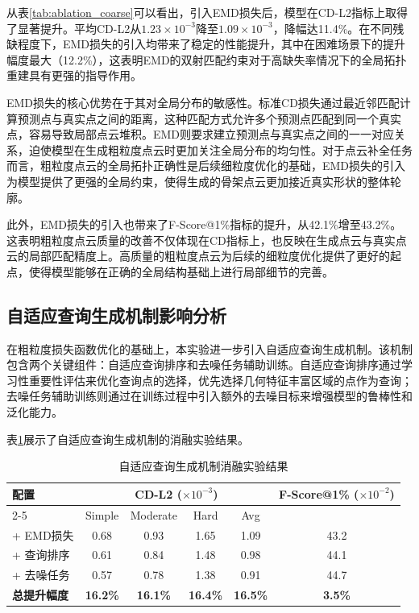 从表\ref{tab:ablation_coarse}可以看出，引入EMD损失后，模型在CD-L2指标上取得了显著提升。平均CD-L2从$1.23 \times 10^{-3}$降至$1.09 \times 10^{-3}$，降幅达11.4\%。在不同残缺程度下，EMD损失的引入均带来了稳定的性能提升，其中在困难场景下的提升幅度最大（12.2\%），这表明EMD的双射匹配约束对于高缺失率情况下的全局拓扑重建具有更强的指导作用。

EMD损失的核心优势在于其对全局分布的敏感性。标准CD损失通过最近邻匹配计算预测点与真实点之间的距离，这种匹配方式允许多个预测点匹配到同一个真实点，容易导致局部点云堆积。EMD则要求建立预测点与真实点之间的一一对应关系，迫使模型在生成粗粒度点云时更加关注全局分布的均匀性。对于点云补全任务而言，粗粒度点云的全局拓扑正确性是后续细粒度优化的基础，EMD损失的引入为模型提供了更强的全局约束，使得生成的骨架点云更加接近真实形状的整体轮廓。

此外，EMD损失的引入也带来了F-Score@1\%指标的提升，从42.1\%增至43.2\%。这表明粗粒度点云质量的改善不仅体现在CD指标上，也反映在生成点云与真实点云的局部匹配精度上。高质量的粗粒度点云为后续的细粒度优化提供了更好的起点，使得模型能够在正确的全局结构基础上进行局部细节的完善。

\subsection{自适应查询生成机制影响分析}

在粗粒度损失函数优化的基础上，本实验进一步引入自适应查询生成机制。该机制包含两个关键组件：自适应查询排序和去噪任务辅助训练。自适应查询排序通过学习性重要性评估来优化查询点的选择，优先选择几何特征丰富区域的点作为查询；去噪任务辅助训练则通过在训练过程中引入额外的去噪目标来增强模型的鲁棒性和泛化能力。

表\ref{tab:ablation_query}展示了自适应查询生成机制的消融实验结果。
\FloatBarrier
\begin{table}[htbp]
\centering
\caption{自适应查询生成机制消融实验结果}
\label{tab:ablation_query}
\begin{tabular}{lccccc}
\toprule
\multirow{2}{*}{配置} & \multicolumn{4}{c}{CD-L2 ($\times 10^{-3}$)} & \multirow{2}{*}{F-Score@1\% ($\times 10^{-2}$)} \\
\cmidrule(lr){2-5}
& Simple & Moderate & Hard & Avg & \\
\midrule
+ EMD损失 & 0.68 & 0.93 & 1.65 & 1.09 & 43.2 \\
+ 查询排序 & 0.61 & 0.84 & 1.48 & 0.98 & 44.1 \\
+ 去噪任务 & 0.57 & 0.78 & 1.38 & 0.91 & 44.7 \\
\midrule
\textbf{总提升幅度} & \textbf{16.2\%} & \textbf{16.1\%} & \textbf{16.4\%} & \textbf{16.5\%} & \textbf{3.5\%} \\
\bottomrule
\end{tabular}
\end{table}
\FloatBarrier

